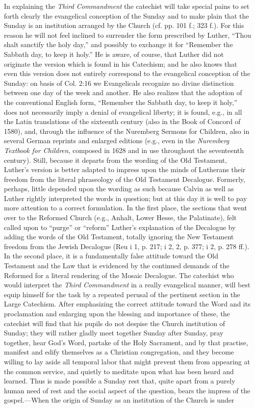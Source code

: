 In explaining the \emph{Third Commandment} the catechist will take special pains to set forth clearly the evangelical conception of the Sunday and to make plain that the Sunday is an institution arranged by the Church (cf. pp. 101 f.; 323 f.). For this reason he will not feel inclined to surrender the form prescribed by Luther, “Thou shalt sanctify the holy day,” and possibly to exchange it for “Remember the Sabbath day, to keep it holy.” He is aware, of course, that Luther did not originate the version which is found in his Catechism; and he also knows that even this version does not entirely correspond to the evangelical conception of the Sunday: on basis of Col. 2:16 we Evangelicals recognize no divine distinction between one day of the week and another. He also realizes that the adoption of the
conventional English form, “Remember the Sabbath day, to keep it holy,” does not necessarily imply a denial of evangelical liberty; it is found, e.g., in all the Latin translations of the sixteenth century (also in the Book of Concord of 1580), and, through the influence of the Nuremberg Sermons for Children, also in several German reprints and enlarged editions (e.g., even in the \emph{Nuremberg Textbook for Children}, composed in 1628 and in use throughout the seventeenth century). Still, because it departs from the wording of the Old Testament, Luther’s version is better adapted to impress upon the minds of Lutherans their freedom from the literal phraseology of the Old Testament Decalogue. Formerly, perhaps, little depended upon the wording as such because Calvin as well as Luther rightly interpreted the words in question; but at this day it is well to pay more attention to a correct formulation. In the first place, the sections that went over to the Reformed Church (e.g., Anhalt, Lower Hesse, the Palatinate), felt called upon to “purge” or “reform” Luther’s explanation of the Decalogue by adding the words of the Old Testament, totally ignoring the New Testament freedom from the Jewish Decalogue (Reu i 1, p. 217; i 2, 2, p. 377; i 2, p. 278 ff.). In the second place, it is a fundamentally false attitude toward the Old Testament and the Law that is evidenced by the continued demands of the Reformed for a literal rendering of the Mosaic Decalogue. The catechist who would interpret the \emph{Third Commandment} in a really evangelical manner, will best equip himself for the task by a repeated perusal of the pertinent section in the Large Catechism. After emphasizing the correct attitude toward the Word and its proclamation and enlarging upon the blessing and importance of these, the catechist will find that his pupils do not despise the Church institution of Sunday; they will rather gladly meet together Sunday after Sunday, pray together, hear God’s Word, partake of the Holy Sacrament, and by that practise, manifest and edify themselves as a Christian congregation, and they become willing to lay aside all temporal labor that might prevent them from appearing at the common service, and quietly to meditate upon what has been heard and learned. Thus is made possible a Sunday rest that, quite apart from a purely human need of rest and the social aspect of the question, bears the impress of the gospel.—When the origin of Sunday as an institution of the Church is under 